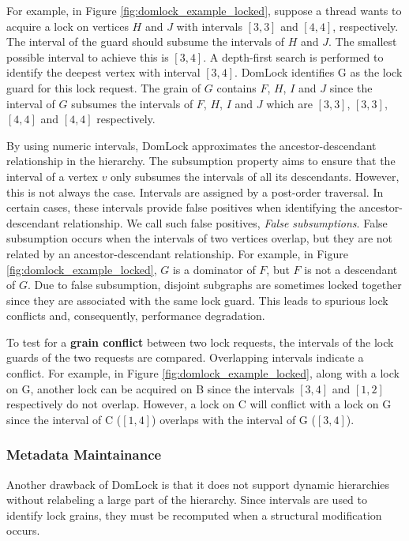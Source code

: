 For example, in Figure \ref{fig:domlock_example_locked}, suppose a thread wants to acquire a lock on vertices $H$ and $J$ with intervals $[3,3]$ and $[4,4]$, respectively. The interval of the guard should subsume the intervals of $H$ and $J$. The smallest possible interval to achieve this is $[3,4]$. A depth-first search is performed to identify the deepest vertex with interval $[3,4]$. DomLock identifies G as the lock guard for this lock request. The grain of $G$ contains $F$, $H$, $I$ and $J$ since the interval of $G$ subsumes the intervals of $F$, $H$, $I$ and $J$ which are $[3,3]$, $[3,3]$, $[4,4]$ and $[4,4]$ respectively.

By using numeric intervals, DomLock approximates the ancestor-descendant relationship in the hierarchy. The subsumption property aims to ensure that the interval of a vertex $v$ only subsumes the intervals of all its descendants. However, this is not always the case. 
Intervals are assigned by a post-order traversal. In certain cases, these intervals provide false positives when identifying the ancestor-descendant relationship. We call such false positives, \emph{False subsumptions}. 
False subsumption occurs when the intervals of two vertices overlap, but they are not related by an ancestor-descendant relationship. 
For example, in Figure \ref{fig:domlock_example_locked}, $G$ is a dominator of $F$, but $F$ is not a descendant of $G$. 
Due to false subsumption, disjoint subgraphs are sometimes locked together since they are associated with the same lock guard. 
This leads to spurious lock conflicts and, consequently, performance degradation. 

To test for a \textbf{grain conflict} between two lock requests, the intervals of the lock guards of the two requests are compared. Overlapping intervals indicate a conflict. For example, in Figure \ref{fig:domlock_example_locked}, along with a lock on G, another lock can be acquired on B since the intervals $[3,4]$ and $[1,2]$ respectively do not overlap. However, a lock on C will conflict with a lock on G since the interval of C ($[1,4]$) overlaps with the interval of G ($[3,4]$).

\subsubsection{Metadata Maintainance}

Another drawback of DomLock is that it does not support dynamic hierarchies without relabeling a large part of the hierarchy.
Since intervals are used to identify lock grains, they must be recomputed when a structural modification occurs.

